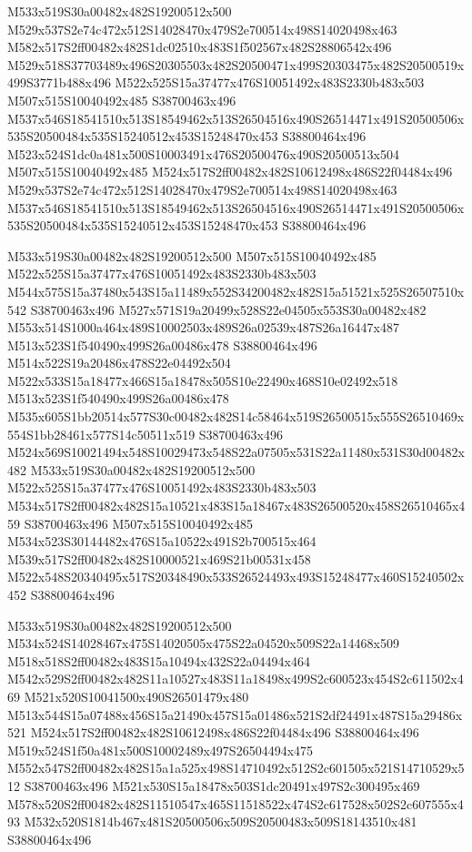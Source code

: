 \documentclass{article}
\begin{document}
\begin{multicols}{2}
M533x519S30a00482x482S19200512x500 M529x537S2e74c472x512S14028470x479S2e700514x498S14020498x463 M582x517S2ff00482x482S1dc02510x483S1f502567x482S28806542x496 M529x518S37703489x496S20305503x482S20500471x499S20303475x482S20500519x499S3771b488x496 M522x525S15a37477x476S10051492x483S2330b483x503 M507x515S10040492x485 S38700463x496 M537x546S18541510x513S18549462x513S26504516x490S26514471x491S20500506x535S20500484x535S15240512x453S15248470x453 S38800464x496 M523x524S1dc0a481x500S10003491x476S20500476x490S20500513x504 M507x515S10040492x485 M524x517S2ff00482x482S10612498x486S22f04484x496 M529x537S2e74c472x512S14028470x479S2e700514x498S14020498x463 M537x546S18541510x513S18549462x513S26504516x490S26514471x491S20500506x535S20500484x535S15240512x453S15248470x453 S38800464x496

M533x519S30a00482x482S19200512x500 M507x515S10040492x485 M522x525S15a37477x476S10051492x483S2330b483x503 M544x575S15a37480x543S15a11489x552S34200482x482S15a51521x525S26507510x542 S38700463x496 M527x571S19a20499x528S22e04505x553S30a00482x482 M553x514S1000a464x489S10002503x489S26a02539x487S26a16447x487 M513x523S1f540490x499S26a00486x478 S38800464x496 M514x522S19a20486x478S22e04492x504 M522x533S15a18477x466S15a18478x505S10e22490x468S10e02492x518 M513x523S1f540490x499S26a00486x478 M535x605S1bb20514x577S30c00482x482S14c58464x519S26500515x555S26510469x554S1bb28461x577S14c50511x519 S38700463x496 M524x569S10021494x548S10029473x548S22a07505x531S22a11480x531S30d00482x482 M533x519S30a00482x482S19200512x500 M522x525S15a37477x476S10051492x483S2330b483x503 M534x517S2ff00482x482S15a10521x483S15a18467x483S26500520x458S26510465x459 S38700463x496 M507x515S10040492x485 M534x523S30144482x476S15a10522x491S2b700515x464 M539x517S2ff00482x482S10000521x469S21b00531x458 M522x548S20340495x517S20348490x533S26524493x493S15248477x460S15240502x452 S38800464x496

M533x519S30a00482x482S19200512x500 M534x524S14028467x475S14020505x475S22a04520x509S22a14468x509 M518x518S2ff00482x483S15a10494x432S22a04494x464 M542x529S2ff00482x482S11a10527x483S11a18498x499S2c600523x454S2c611502x469 M521x520S10041500x490S26501479x480 M513x544S15a07488x456S15a21490x457S15a01486x521S2df24491x487S15a29486x521 M524x517S2ff00482x482S10612498x486S22f04484x496 S38800464x496 M519x524S1f50a481x500S10002489x497S26504494x475 M552x547S2ff00482x482S15a1a525x498S14710492x512S2c601505x521S14710529x512 S38700463x496 M521x530S15a18478x503S1dc20491x497S2c300495x469 M578x520S2ff00482x482S11510547x465S11518522x474S2c617528x502S2c607555x493 M532x520S1814b467x481S20500506x509S20500483x509S18143510x481 S38800464x496


\end{multicols}
\end{document}
